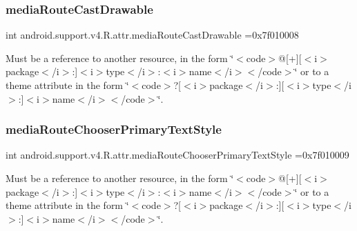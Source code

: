 \subsubsection{\texorpdfstring{media\+Route\+Cast\+Drawable}{mediaRouteCastDrawable}}
{\footnotesize\ttfamily int android.\+support.\+v4.\+R.\+attr.\+media\+Route\+Cast\+Drawable =0x7f010008\hspace{0.3cm}{\ttfamily [static]}}

Must be a reference to another resource, in the form \char`\"{}$<$code$>$@\mbox{[}+\mbox{]}\mbox{[}$<$i$>$package$<$/i$>$\+:\mbox{]}$<$i$>$type$<$/i$>$\+:$<$i$>$name$<$/i$>$$<$/code$>$\char`\"{} or to a theme attribute in the form \char`\"{}$<$code$>$?\mbox{[}$<$i$>$package$<$/i$>$\+:\mbox{]}\mbox{[}$<$i$>$type$<$/i$>$\+:\mbox{]}$<$i$>$name$<$/i$>$$<$/code$>$\char`\"{}. \mbox{\label{classandroid_1_1support_1_1v4_1_1R_1_1attr_a4dff0d12665745adbe5491bb59529740}} 
\subsubsection{\texorpdfstring{media\+Route\+Chooser\+Primary\+Text\+Style}{mediaRouteChooserPrimaryTextStyle}}
{\footnotesize\ttfamily int android.\+support.\+v4.\+R.\+attr.\+media\+Route\+Chooser\+Primary\+Text\+Style =0x7f010009\hspace{0.3cm}{\ttfamily [static]}}

Must be a reference to another resource, in the form \char`\"{}$<$code$>$@\mbox{[}+\mbox{]}\mbox{[}$<$i$>$package$<$/i$>$\+:\mbox{]}$<$i$>$type$<$/i$>$\+:$<$i$>$name$<$/i$>$$<$/code$>$\char`\"{} or to a theme attribute in the form \char`\"{}$<$code$>$?\mbox{[}$<$i$>$package$<$/i$>$\+:\mbox{]}\mbox{[}$<$i$>$type$<$/i$>$\+:\mbox{]}$<$i$>$name$<$/i$>$$<$/code$>$\char`\"{}. \mbox{\label{classandroid_1_1support_1_1v4_1_1R_1_1attr_aacbff453bc889179388a1ce2e51a5169}} 
